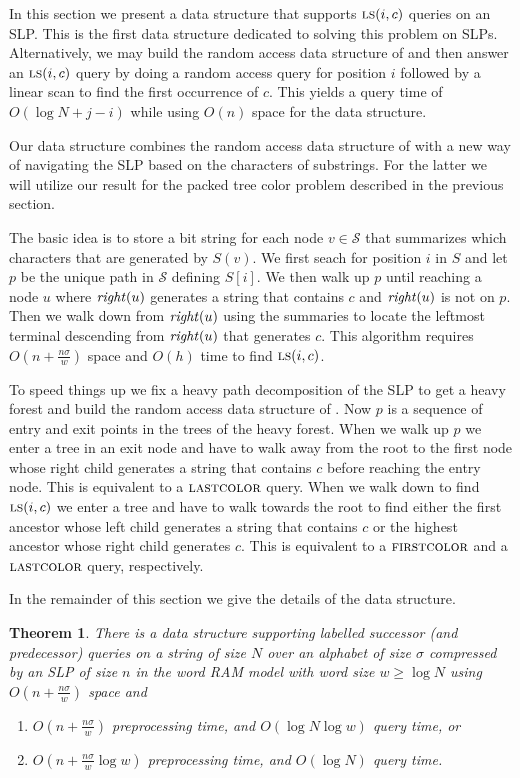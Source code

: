 \documentclass[11pt]{article}
\newcommand{\str}{\ensuremath{S} }
\newcommand{\slp}{\ensuremath{\mathcal{S}} }
\newcommand{\fca}{\ensuremath{\textsc{firstcolor}}}
\newcommand{\lca}{\ensuremath{\textsc{lastcolor}}}
\newcommand{\labsuc}{\ensuremath{\textsc{ls}}}
\newcommand{\rightc}{\ensuremath{\text{\textit{right}}}}
\newtheorem{theorem}{Theorem}
\begin{document}
In this section we present a data structure that supports $\labsuc(i,c)$ queries on an SLP.  This is the first data structure dedicated to solving this problem on SLPs. Alternatively, we may build the random access data structure of \cite{bille2011random} and then answer an $\labsuc(i,c)$ query by doing a random access query for position $i$ followed by a linear scan to find the first occurrence of $c$. This yields a query time of $O(\log N+j-i)$ while using $O(n)$ space for the data structure. 

Our data structure combines the random access data structure of \cite{bille2011random} with a new way of navigating the SLP based on the characters of substrings. For the latter we will utilize our result for the packed tree color problem described in the previous section.

The basic idea is to store a bit string for each node $v\in \slp$ that summarizes which characters that are generated by $\str(v)$. We first seach for position $i$ in $\str$ and let $p$ be the unique path in $\slp$ defining $S[i]$. We then walk up $p$ until reaching a node $u$ where $\rightc(u)$ generates a string that contains $c$ and $\rightc(u)$ is not on $p$. Then we walk down from $\rightc(u)$ using the summaries to locate the leftmost terminal descending from $\rightc(u)$ that generates $c$. This algorithm requires $O(n+\frac{n\sigma}{w})$ space and $O(h)$ time to find $\labsuc(i,c)$.

To speed things up we fix a heavy path decomposition of the SLP to get a heavy forest and build the random access data structure of \cite{bille2011random}. Now $p$ is a sequence of entry and exit points in the trees of the heavy forest. When we walk up $p$ we enter a tree in an exit node and have to walk away from the root to the first node whose right child generates a string that contains $c$ before reaching the entry node. This is equivalent to a $\lca$ query. When we walk down to find $\labsuc(i,c)$ we enter a tree and have to walk towards the root to find either the first ancestor whose left child generates a string that contains $c$ or the highest ancestor whose right child generates $c$. This is equivalent to a $\fca$ and a $\lca$ query, respectively.

In the remainder of this section we give the details of the data structure.


\begin{theorem}\label{thm:LSDS}
There is a data structure supporting labelled successor (and predecessor) queries on a string of size $N$ over an alphabet of size $\sigma$ compressed by an SLP of size $n$ in the word RAM model with word size $w\geq \log N$ using $O(n+\frac{n\sigma}{w})$ space and

\begin{enumerate}
	\item[\textit{(i)}] $O(n+\frac{n\sigma}{w})$ preprocessing time, and $O(\log N\log w)$ query time, or
	\item[\textit{(ii)}] $O(n+\frac{n\sigma}{w}\log w)$ preprocessing time, and $O(\log N)$ query time.
\end{enumerate}
\end{theorem}
\end{document}
